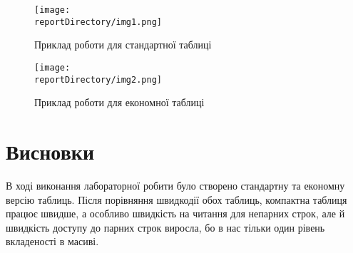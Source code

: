 \begin{figure}[h!]
    \centering
    \texttt{[image: \\reportDirectory/img1.png]}
    \caption{Приклад роботи для стандартної таблиці}
    \label{fig:task}
\end{figure}
\begin{figure}[h!]
    \centering
    \texttt{[image: \\reportDirectory/img2.png]}
    \caption{Приклад роботи для економної таблиці}
    \label{fig:task}
\end{figure}

\newpage
\section{Висновки}
В ході виконання лабораторної робити було створено стандартну та економну версію таблиць.
Після порівняння швидкодії обох таблиць, компактна таблиця працює швидше,
а особливо швидкість на читання для непарних строк, але й швидкість доступу до парних строк виросла,
бо в нас тільки один рівень вкладеності в масиві.
